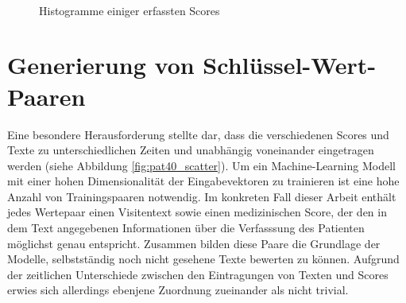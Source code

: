 \begin{figure}[htb]
    \captionsetup[subfigure]{labelformat=empty, justification=centering}

    \centering
     \qquad
     \\ %
     \qquad
    \caption{Histogramme einiger erfassten Scores}
    \label{fig:score_histograms}
\end{figure}


\section{Generierung von Schlüssel-Wert-Paaren}\label{sec:pairgen}
Eine besondere Herausforderung stellte dar, dass die verschiedenen Scores und Texte zu unterschiedlichen Zeiten und unabhängig voneinander eingetragen werden (siehe Abbildung \ref{fig:pat40_scatter}).
Um ein Machine-Learning Modell mit einer hohen Dimensionalität der Eingabevektoren zu trainieren ist eine hohe Anzahl von Trainingspaaren notwendig. Im konkreten Fall dieser Arbeit enthält jedes Wertepaar einen Visitentext sowie einen medizinischen Score, der den in dem Text angegebenen Informationen über die Verfasssung des Patienten möglichst genau entspricht. Zusammen bilden diese Paare die Grundlage der Modelle, selbstständig noch nicht gesehene Texte bewerten zu können. Aufgrund der zeitlichen Unterschiede zwischen den Eintragungen von Texten und Scores erwies sich allerdings ebenjene Zuordnung zueinander als nicht trivial. 


